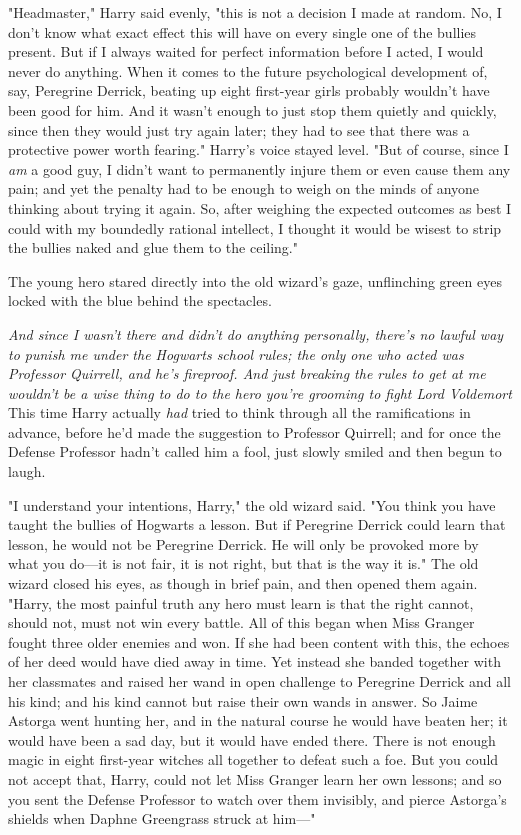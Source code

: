 "Headmaster," Harry said evenly, "this is not a decision I made at random. No,
I don't know what exact effect this will have on every single one of the
bullies present. But if I always waited for perfect information before I acted,
I would never do anything. When it comes to the future psychological
development of, say, Peregrine Derrick, beating up eight first-year girls
probably wouldn't have been good for him. And it wasn't enough to just stop
them quietly and quickly, since then they would just try again later; they had
to see that there was a protective power worth fearing." Harry's voice stayed
level. "But of course, since I \emph{am} a good guy, I didn't want to
permanently injure them or even cause them any pain; and yet the penalty had to
be enough to weigh on the minds of anyone thinking about trying it again. So,
after weighing the expected outcomes as best I could with my boundedly rational
intellect, I thought it would be wisest to strip the bullies naked and glue
them to the ceiling."

The young hero stared directly into the old wizard's gaze, unflinching green
eyes locked with the blue behind the spectacles.

\emph{And since I wasn't there and didn't do anything personally, there's no
lawful way to punish me under the Hogwarts school rules; the only one who acted
was Professor Quirrell, and he's fireproof. And just breaking the rules to get
at me wouldn't be a wise thing to do to the hero you're grooming to fight Lord
Voldemort{\el}} This time Harry actually \emph{had} tried to think through
all the ramifications in advance, before he'd made the suggestion to Professor
Quirrell; and for once the Defense Professor hadn't called him a fool, just
slowly smiled and then begun to laugh.

"I understand your intentions, Harry," the old wizard said. "You think you have
taught the bullies of Hogwarts a lesson. But if Peregrine Derrick could learn
that lesson, he would not be Peregrine Derrick. He will only be provoked more
by what you do---it is not fair, it is not right, but that is the way it is."
The old wizard closed his eyes, as though in brief pain, and then opened them
again. "Harry, the most painful truth any hero must learn is that the right
cannot, should not, must not win every battle. All of this began when Miss
Granger fought three older enemies and won. If she had been content with this,
the echoes of her deed would have died away in time. Yet instead she banded
together with her classmates and raised her wand in open challenge to Peregrine
Derrick and all his kind; and his kind cannot but raise their own wands in
answer. So Jaime Astorga went hunting her, and in the natural course he would
have beaten her; it would have been a sad day, but it would have ended there.
There is not enough magic in eight first-year witches all together to defeat
such a foe. But you could not accept that, Harry, could not let Miss Granger
learn her own lessons; and so you sent the Defense Professor to watch over them
invisibly, and pierce Astorga's shields when Daphne Greengrass struck at him\mbox{---}"

